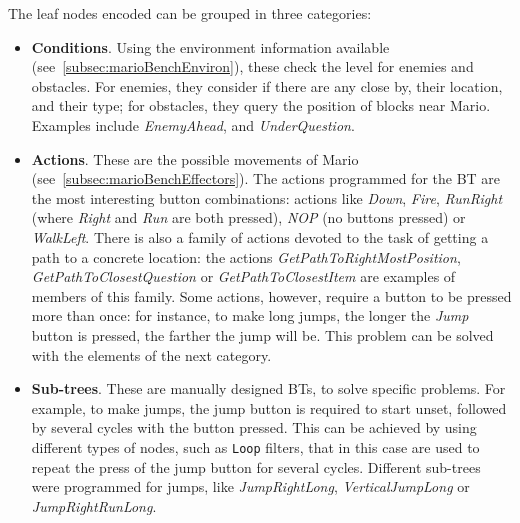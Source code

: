 \documentclass[conference]{IEEEtran}
\begin{document}
The leaf nodes encoded can be grouped in three categories:

\begin{itemize}
\item \textbf{Conditions}. Using the environment information available 
(see~\ref{subsec:marioBenchEnviron}), these check the level for enemies and
obstacles. For enemies, they consider if there are any close by, their
location, and their type; for obstacles, they query the position of
blocks near Mario. Examples include \textit{EnemyAhead}, and 
\textit{UnderQuestion}.

\item \textbf{Actions}. These are the possible movements of Mario 
(see~\ref{subsec:marioBenchEffectors}). The actions programmed for the BT are the
most interesting button combinations: actions like
\textit{Down}, \textit{Fire}, \textit{RunRight} (where \textit{Right} and
\textit{Run} are both pressed), \textit{NOP} (no buttons pressed) or
\textit{WalkLeft}. There is also a family of actions devoted to the task of
getting a path to a concrete location: the actions 
\textit{GetPathToRightMostPosition}, \textit{GetPathToClosestQuestion} or
\textit{GetPathToClosestItem} are examples of members of this family. 
Some actions, however, require a button to be pressed more
than once: for instance, to make long jumps, the longer the \textit{Jump}
button is pressed, the farther the jump will be. This problem can be solved
with the elements of the next category.

\item \textbf{Sub-trees}. These are manually designed BTs, to solve specific
problems. For example, to make jumps, the jump button is required to start
unset, followed by several cycles with the button pressed. This can be
achieved by using different types of nodes, such as \texttt{Loop} filters,
that in this case are used to repeat the press of the jump button for several cycles.
Different sub-trees were programmed for jumps, like 
\textit{JumpRightLong}, \textit{VerticalJumpLong} or \textit{JumpRightRunLong}.




\end{itemize}
\end{document}
